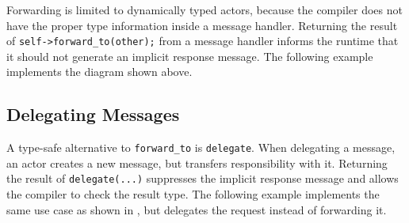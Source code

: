 Forwarding is limited to dynamically typed actors, because the compiler does not have the proper type information inside a message handler. Returning the result of \lstinline^self->forward_to(other);^ from a message handler informs the runtime that it should not generate an implicit response message. The following example implements the diagram shown above.

\clearpage


\clearpage
\subsection{Delegating Messages}
\label{delegate}

A type-safe alternative to \lstinline^forward_to^ is \lstinline^delegate^.
When delegating a message, an actor creates a new message, but transfers responsibility with it.
Returning the result of \lstinline^delegate(...)^ suppresses the implicit response message and allows the compiler to check the result type.
The following example implements the same use case as shown in , but delegates the request instead of forwarding it.


